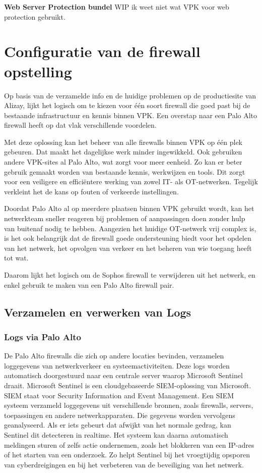 \textbf{Web Server Protection bundel}
WIP ik weet niet wat VPK voor web protection gebruikt.




\chapter{Configuratie van de firewall opstelling}
\label{ch:configFW}

Op basis van de verzamelde info en de huidige problemen op de productiesite van Alizay, lijkt het logisch om te kiezen voor één soort firewall die goed past bij de bestaande infrastructuur en kennis binnen VPK. Een overstap naar een Palo Alto firewall heeft op dat vlak verschillende voordelen.

Met deze oplossing kan het beheer van alle firewalls binnen VPK op één plek gebeuren. Dat maakt het dagelijkse werk minder ingewikkeld. Ook gebruiken andere VPK-sites al Palo Alto, wat zorgt voor meer eenheid. Zo kan er beter gebruik gemaakt worden van bestaande kennis, werkwijzen en tools. Dit zorgt voor een veiligere en efficiëntere werking van zowel IT- als OT-netwerken. Tegelijk verkleint het de kans op fouten of verkeerde instellingen.

Doordat Palo Alto al op meerdere plaatsen binnen VPK gebruikt wordt, kan het netwerkteam sneller reageren bij problemen of aanpassingen doen zonder hulp van buitenaf nodig te hebben. Aangezien het huidige OT-netwerk vrij complex is, is het ook belangrijk dat de firewall goede ondersteuning biedt voor het opdelen van het netwerk, het opvolgen van verkeer en het beheren van wie toegang heeft tot wat.

Daarom lijkt het logisch om de Sophos firewall te verwijderen uit het netwerk, en enkel gebruik te maken van een Palo Alto firewall pair.

\newpage

\section{Verzamelen en verwerken van Logs}

\subsection{Logs via Palo Alto}
De Palo Alto firewalls die zich op andere locaties bevinden, verzamelen loggegevens van netwerkverkeer en systeemactiviteiten. Deze logs worden automatisch doorgestuurd naar een centrale server waarop Microsoft Sentinel draait. Microsoft Sentinel is een cloudgebaseerde SIEM-oplossing van Microsoft. SIEM staat voor Security Information and Event Management.
Een SIEM systeem verzameld loggegevens uit verschillende bronnen, zoals firewalls, servers, toepassingen en andere netwerkapparaten. Die gegevens worden vervolgens geanalyseerd. Als er iets gebeurt dat afwijkt van het normale gedrag, kan Sentinel dit detecteren in realtime. Het systeem kan daarna automatisch meldingen sturen of zelfs actie ondernemen, zoals het blokkeren van een IP-adres of het starten van een onderzoek. Zo helpt Sentinel bij het vroegtijdig opsporen van cyberdreigingen en bij het verbeteren van de beveiliging van het netwerk.


